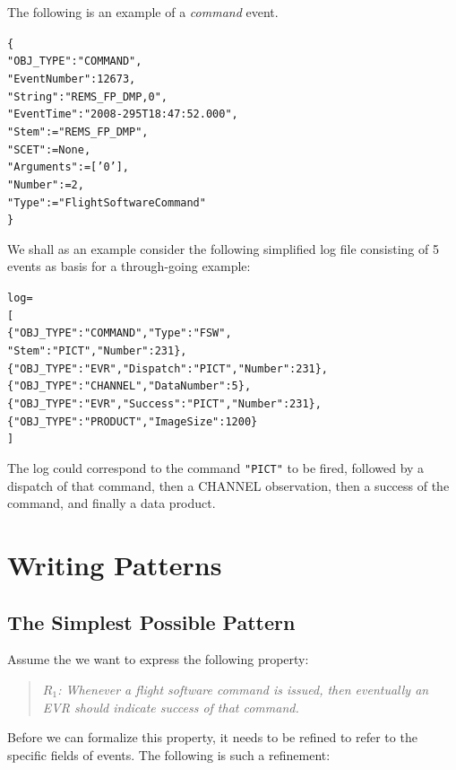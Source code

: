 \documentclass{report}
\newenvironment{code}[1] %
{
\vspace{0.5cm}
\begin{center}
\begin{Sbox}
\begin{minipage}{11cm}
\begin{alltt}
{\bf\em #1}
}
{
\end{alltt}
\end{minipage}
\end{Sbox}
\setlength{\fboxsep}{8pt}
\fbox{\TheSbox}
\end{center}
\vspace{0.5cm}
}
\begin{document}
\vspace{0.5cm}

\noindent
The following is an example of a {\em command} event. 

\begin{code}{}
  \{
    "OBJ_TYPE" : "COMMAND",
    "EventNumber" : 12673,
    "String" : "REMS_FP_DMP,0",
    "EventTime" : "2008-295T18:47:52.000",
    "Stem" := "REMS_FP_DMP",
    "SCET" := None,
    "Arguments" := ['0'],
    "Number" := 2,
    "Type" := "FlightSoftwareCommand"
  \}
\end{code}

\noindent We shall as an example consider the following simplified log file consisting of 5 events as basis for a through-going example:

\label{logfile}

\begin{code}{}
  log = 
   [
    \{"OBJ_TYPE" : "COMMAND",  "Type" : "FSW", 
        "Stem" : "PICT", "Number" : 231\},
    \{"OBJ_TYPE" : "EVR",  "Dispatch" : "PICT", "Number" : 231\},
    \{"OBJ_TYPE" : "CHANNEL",  "DataNumber" : 5\},
    \{"OBJ_TYPE" : "EVR",  "Success" : "PICT", "Number" : 231\},
    \{"OBJ_TYPE" : "PRODUCT", "ImageSize" : 1200\}
   ]
\end{code}

\noindent The log could correspond to the command {\tt "PICT"} to be fired, followed by 
a dispatch of that command, then a CHANNEL observation, then a success of the command, 
and finally a data product.


\chapter{Writing Patterns}

\section{The Simplest Possible Pattern}

Assume the we want to express the following property:

\begin{quote}
	{\em $R_1$: Whenever a flight software command is issued, then eventually
	an EVR should indicate success of that command.} 
\end{quote}

\noindent Before we can formalize this property, it needs to be refined to refer to the specific fields of events.
The following is such a refinement: 
\end{document}
